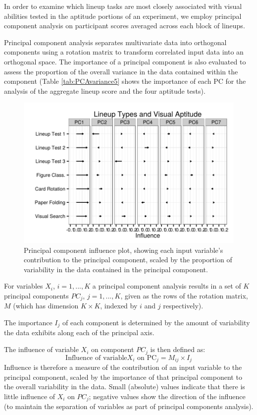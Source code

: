 \documentclass[11pt]{isuthesis}\usepackage[]{graphicx}\usepackage[]{color}
\begin{document}
In order to examine which lineup tasks are most closely associated with visual abilities tested in the aptitude portions of an experiment, we employ principal component analysis on participant scores averaged across each block of lineups.

Principal component analysis separates multivariate data into orthogonal components using a rotation matrix to transform correlated input data into an orthogonal space. The importance of a principal component is also evaluated to assess the proportion of the overall variance in the data contained within the component (Table \ref{tab:PCAvariance5} shows the importance of each PC for the analysis of the aggregate lineup score and the four aptitude tests). 


\begin{figure}[ht]\centering
\includegraphics[width=.5\linewidth]{fig-lineupblockpca-1}
\caption[Principal component influence]{Principal component influence plot, showing each input variable's contribution to the principal component, scaled by the proportion of variability in the data contained in the principal component.\label{fig:influence}}
\end{figure}

For variables $X_i$, $i=1, ..., K$ a principal component analysis results in a set of $K$ principal  components $PC_j$, $j=1, ..., K$, given as the rows of the rotation matrix, $M$ (which has dimension $K\times K$, indexed by $i$ and $j$ respectively).

The importance $I_j$ of each component is determined by the amount of variability the data exhibits along each of the principal axis.

The influence of variable $X_i$ on component $PC_j$ is then defined as:
%
$$\text{Influence of variable} X_i \text{ on PC}_j = M_{ij}\times I_j$$
%
Influence is therefore a measure of the contribution of an input variable to the principal component, scaled by the importance of that principal component to the overall variability in the data. Small (absolute) values indicate that there is little influence of $X_i$ on $PC_j$; negative values show the direction of the influence (to maintain the separation of variables as part of principal components analysis). 
\end{document}

